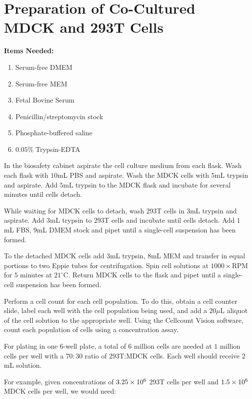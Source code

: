 \section{Preparation of Co-Cultured MDCK and 293T Cells}

{\bfseries Items Needed:}
\begin{enumerate}
	\item Serum-free DMEM
	\item Serum-free MEM
	\item Fetal Bovine Serum
	\item Penicillin/streptomycin stock
	\item Phosphate-buffered saline
	\item $0.05\%$ Trypsin-EDTA
\end{enumerate}

In the biosafety cabinet aspirate the cell culture medium from each flask. Wash each flask with $10$mL PBS and aspirate. Wash the MDCK cells with $5$mL trypsin and aspirate. Add $5$mL trypsin to the MDCK flask and incubate for several minutes until cells detach.

While waiting for MDCK cells to detach, wash 293T cells in $3$mL trypsin and aspirate. Add $3$mL trypsin to 293T cells and incubate until cells detach. Add $1$mL FBS, $9$mL DMEM stock and pipet until a single-cell suspension has been formed.

To the detached MDCK cells add $3$mL trypsin, $8$mL MEM and transfer in equal portions to two Eppie tubes for centrifugation. Spin cell solutions at $1000\times$RPM for $5$ minutes at $21^{\circ}$C. Return MDCK cells to the flask and pipet until a single-cell suspension has been formed.

Perform a cell count for each cell population. To do this, obtain a cell counter slide, label each well with the cell population being used, and add a $20\mu$L aliquot of the cell solution to the appropriate well. Using the Cellcount Vision software, count each population of cells using a concentration assay.

For plating in one $6$-well plate, a total of $6$ million cells are needed at $1$ million cells per well with a $70:30$ ratio of 293T:MDCK cells. Each well should receive $2$mL solution.

For example, given concentrations of $3.25\times 10^{6}$ 293T cells per well and $1.5\times 10^{6}$ MDCK cells per well, we would need:

